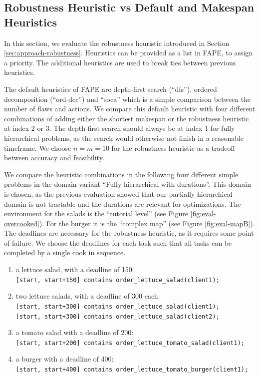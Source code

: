 \subsection{Robustness Heuristic vs Default and Makespan Heuristics}
\label{sec:evaluation-robustness}

In this section, we evaluate the robustness heuristic introduced in Section \ref{sec:approach-robustness}.
Heuristics can be provided as a list in \ac{FAPE}, to assign a priority.
The additional heuristics are used to break ties between previous heuristics.

The default heuristics of \ac{FAPE} are depth-first search (``dfs''), ordered decomposition (``ord-dec'') and ``soca'' which is a simple comparison between the number of flaws and actions.
We compare this default heuristic with four different combinations of adding either the shortest makespan or the robustness heuristic at index 2 or 3.
The depth-first search should always be at index 1 for fully hierarchical problems, as the search would otherwise not finish in a reasonable timeframe.
We choose $n=m=10$ for the robustness heuristic as a tradeoff between accuracy and feasibility.


We compare the heuristic combinations in the following four different simple problems in the domain variant ``Fully hierarchical with durations''.
This domain is chosen, as the previous evaluation showed that our partially hierarchical domain is not tractable and the durations are relevant for optimizations.
The environment for the salads is the ``tutorial level'' (see Figure \ref{fig:eval-overcooked}).
For the burger it is the ``complex map'' (see Figure \ref{fig:eval-mapB}).
The deadlines are necessary for the robustness heuristic, as it requires some point of failure.
We choose the deadlines for each task such that all tasks can be completed by a single cook in sequence.
\begin{enumerate}
  \item a lettuce salad, with a deadline of 150:\\ 
    \verb|[start, start+150] contains order_lettuce_salad(client1);|
  \item two lettuce salads, with a deadline of 300 each:\\
    \verb|[start, start+300] contains order_lettuce_salad(client1);|\\
    \verb|[start, start+300] contains order_lettuce_salad(client2);|
  \item a tomato salad with a deadline of 200:\\
    \verb|[start, start+200] contains order_lettuce_tomato_salad(client1);|
  \item a burger with a deadline of 400:\\
    \verb|[start, start+400] contains order_lettuce_tomato_burger(client1);|
\end{enumerate}

